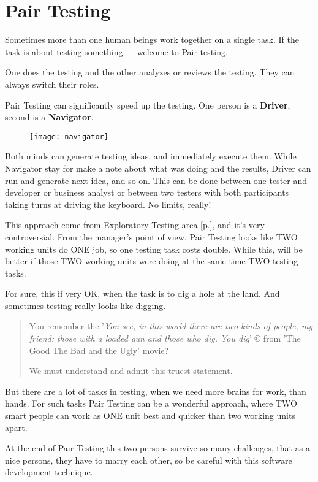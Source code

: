 \section{Pair Testing}
\label{sec:Pair Testing}

Sometimes more than one human beings work together on a single task. If the task is about testing something — welcome to Pair testing.

One does the testing and the other analyzes or reviews the testing. They can always switch their roles.

Pair Testing can significantly speed up the testing. One person is a \textbf{Driver}, second is a \textbf{Navigator}. 

\begin{figure}[!h]
\centering
\texttt{[image: navigator]}
\caption{}
\label{fig:Navigator}
\end{figure}

Both minds can generate testing ideas, and immediately execute them. While Navigator stay for make a note about what was doing and the results, Driver can run and generate next idea, and so on. This can be done between one tester and developer or business analyst or between two testers with both participants taking turns at driving the keyboard. No limits, really!

This approach come from Exploratory Testing area [p.\pageref{sec:Exploratory Testing}], and it's very controversial. From the manager's point of view, Pair Testing looks like TWO working units do ONE job, so one testing task costs double. While this, will be better if those TWO working units were doing at the same time TWO testing tasks. 

For sure, this if very OK, when the task is to dig a hole at the land. And sometimes testing really looks like digging.

\begin{quote}
You remember the '\textit{You see, in this world there are two kinds of people, my friend: those with a loaded gun and those who dig. You dig}' © from 'The Good The Bad and the Ugly' movie? 

We must understand and admit this truest statement.                                                                                                                                                                                                                                                 \end{quote} 

But there are a lot of tasks in testing, when we need more brains for work, than hands. For such tasks Pair Testing can be a wonderful approach, where TWO smart people can work as ONE unit best and quicker than two working units apart.

At the end of Pair Testing this two persons survive so many challenges, that as a nice persons, they have to marry each other, so be careful with this software development technique.